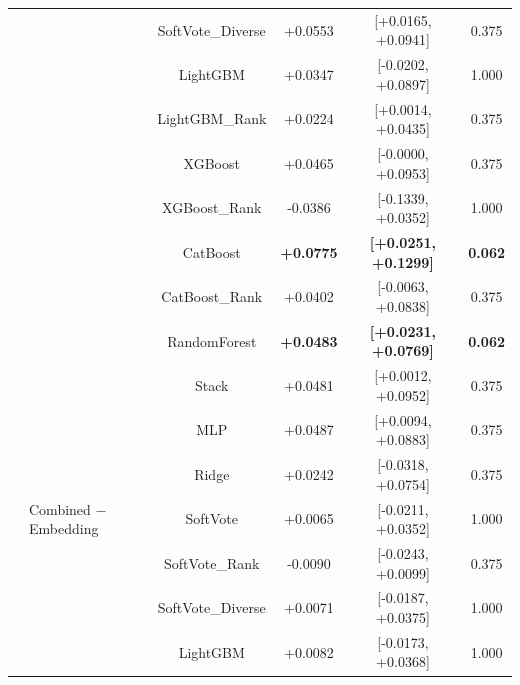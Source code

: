 \documentclass[10pt,journal,compsoc]{IEEEtran}
\begin{document}
\begin{table}[tbp]
\begin{tabular}{llcccc}
               &                          & SoftVote\_Diverse  & +0.0553                & [+0.0165, +0.0941]               & 0.375      \\
               &                          & LightGBM           & +0.0347                & [-0.0202, +0.0897]               & 1.000      \\
               &                          & LightGBM\_Rank     & +0.0224                & [+0.0014, +0.0435]               & 0.375      \\
               &                          & XGBoost            & +0.0465                & [-0.0000, +0.0953]               & 0.375      \\
               &                          & XGBoost\_Rank      & -0.0386                & [-0.1339, +0.0352]               & 1.000      \\
               &                          & CatBoost           & \textbf{+0.0775}       & \textbf{[+0.0251, +0.1299]}      & \textbf{0.062} \\
               &                          & CatBoost\_Rank     & +0.0402                & [-0.0063, +0.0838]               & 0.375      \\
               &                          & RandomForest       & \textbf{+0.0483}       & \textbf{[+0.0231, +0.0769]}      & \textbf{0.062} \\
               &                          & Stack              & +0.0481                & [+0.0012, +0.0952]               & 0.375      \\
               &                          & MLP                & +0.0487                & [+0.0094, +0.0883]               & 0.375      \\
               &                          & Ridge              & +0.0242                & [-0.0318, +0.0754]               & 0.375      \\
               & Combined $-$ Embedding   & SoftVote           & +0.0065                & [-0.0211, +0.0352]               & 1.000      \\
               &                          & SoftVote\_Rank     & -0.0090                & [-0.0243, +0.0099]               & 0.375      \\
               &                          & SoftVote\_Diverse  & +0.0071                & [-0.0187, +0.0375]               & 1.000      \\
               &                          & LightGBM           & +0.0082                & [-0.0173, +0.0368]               & 1.000      \\

\end{tabular}
\end{table}
\end{document}
